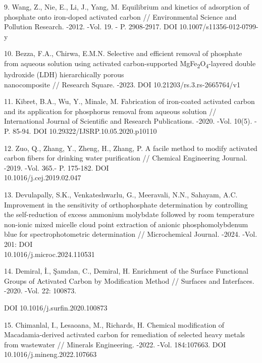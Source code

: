 \begin{references}
9. Wang, Z., Nie, E., Li, J., Yang, M. Equilibrium and kinetics of
adsorption of phosphate onto iron-doped activated carbon //
Environmental Science and Pollution Research. -2012. -Vol. 19. - P.
2908-2917. DOI 10.1007/s11356-012-0799-y

10. Bezza, F.A., Chirwa, E.M.N. Selective and efficient removal of
phosphate from aqueous solution using activated carbon-supported
MgFe\textsubscript{2}O\textsubscript{4}-layered double hydroxide (LDH)
hierarchically porous \\nanocomposite // Research Square. -2023. DOI
10.21203/rs.3.rs-2665764/v1

11. Kibret, B.A., Wu, Y., Minale, M. Fabrication of iron-coated activated
carbon and its application for phosphorus removal from aqueous solution
// International Journal of Scientific and Research Publications. -2020.
-Vol. 10(5). -P. 85-94. DOI 10.29322/IJSRP.10.05.2020.p10110

12. Zuo, Q., Zhang, Y., Zheng, H., Zhang, P. A facile method to modify
activated carbon fibers for drinking water purification // Chemical
Engineering Journal. -2019. -Vol. 365.- P. 175-182. DOI\\
10.1016/j.cej.2019.02.047

13. Devulapally, S.K., Venkateshwarlu, G., Meeravali, N.N., Sahayam, A.C.
Improvement in the sensitivity of orthophosphate determination by
controlling the self-reduction of excess ammonium molybdate followed by
room temperature non-ionic mixed micelle cloud point extraction of
anionic phosphomolybdenum blue for spectrophotometric determination //
Microchemical Journal. -2024. -Vol. 201: DOI\\
10.1016/j.microc.2024.110531

14. Demiral, İ., Şamdan, C., Demiral, H. Enrichment of the Surface
Functional Groups of Activated Carbon by Modification Method // Surfaces
and Interfaces. -2020. -Vol. 22: 100873.

DOI 10.1016/j.surfin.2020.100873

15. Chimanlal, I., Lesaoana, M., Richards, H. Chemical modification of
Macadamia-derived activated carbon for remediation of selected heavy
metals from wastewater // Minerals Engineering. -2022. -Vol. 184:107663.
DOI 10.1016/j.mineng.2022.107663
\end{references}

